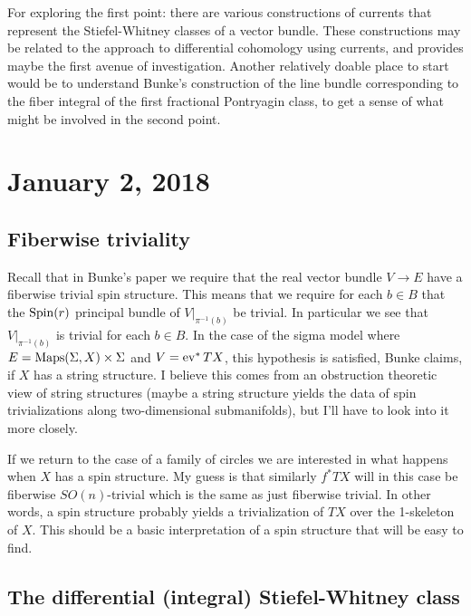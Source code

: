 \documentclass{amsart}
\begin{document}
For exploring the first point: there are various constructions of currents
that represent the Stiefel-Whitney classes of a vector bundle. These constructions
may be related to the approach to differential cohomology using currents, and
provides maybe the first avenue of investigation. Another relatively doable place
to start would be to understand Bunke's construction of the line bundle corresponding
to the fiber integral of the first fractional Pontryagin class, to get a sense
of what might be involved in the second point.

\section{January 2, 2018}

\subsection{Fiberwise triviality}

Recall that in Bunke's paper we require that the real vector bundle $V\to E$
have a fiberwise trivial spin structure. This means that we require for each
$b\in B$ that the $\operatorname{Spin}(r)$ principal bundle of $V|_{\pi^{-1}(b)}$ be trivial.
In particular we see that $V|_{\pi^{-1}(b)}$ is trivial for each $b\in B$.
In the case of the sigma model where $E=\operatorname*{Maps}(\Sigma, X)\times \Sigma$
and $V=\operatorname{ev}^*TX$, this hypothesis is satisfied, Bunke claims, if $X$ has a string
structure. I believe this comes from an obstruction theoretic view of string
structures (maybe a string structure yields the data of spin trivializations
along two-dimensional submanifolds), but I'll have to look into it more closely.

If we return to the case of a family of circles we are interested in what
happens when $X$ has a spin structure. My guess is that similarly $f^*TX$
will in this case be fiberwise $SO(n)$-trivial which is the same as just
fiberwise trivial. In other words, a spin structure probably yields a trivialization
of $TX$ over the 1-skeleton of $X$. This should be a basic interpretation
of a spin structure that will be easy to find.

\subsection{The differential (integral) Stiefel-Whitney class}
\end{document}
